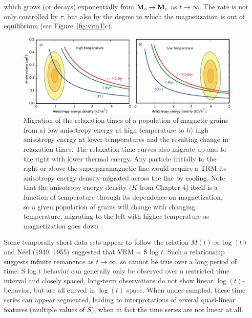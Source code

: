 \noindent which grows (or decays) exponentially from $\hbox{\bf M}_o \rightarrow \hbox{\bf M}_e$ as
$t \rightarrow
\infty $. The rate is not only controlled by $\tau$,
but also  by the degree
to which the magnetization is out of equilibrium (see Figure~\ref{fig:vrm1}c). 

\begin{figure}[htb]
\centering  \includegraphics[width=14 cm]{EPSfiles/neel-trm.eps}
\caption{Migration of the relaxation times of a population of magnetic grains from a) low anisotropy energy at high temperature  to b) high anisotropy energy at lower temperatures and the resulting change in relaxation times.   The relaxation time curves also migrate up and to the right with lower thermal energy.   Any particle initially to the right or above the superparamagnetic line would acquire a TRM its anisotropy energy density  migrated across the line by cooling.  Note that the anisotropy energy density ($K$ from Chapter 4) itself is a function of temperature through its dependence on magnetization, so a given population of grains will change with changing temperature, migrating to the left with higher temperature as magnetization goes down .  }
\label{fig:trm-neel}
\end{figure}


Some temporally short data sets appear to follow the relation $M(t)\propto \log(t)$ and
 N\'eel (1949, 1955)  suggested that VRM = S  log $t$.  Such a relationship
suggests infinite remanence as $t \rightarrow \infty $, so cannot be
true over a long period of time.
S log $t$  behavior can generally only be observed over a restricted
time interval and closely spaced, long-term observations do not show
linear  $\log(t)$-behavior, but are all curved in $\log(t)$ space.   When under-sampled, these time series can appear segmented, leading to interpretations of several quasi-linear features (multiple values of $S$), when in fact the time series are not linear at all.  



